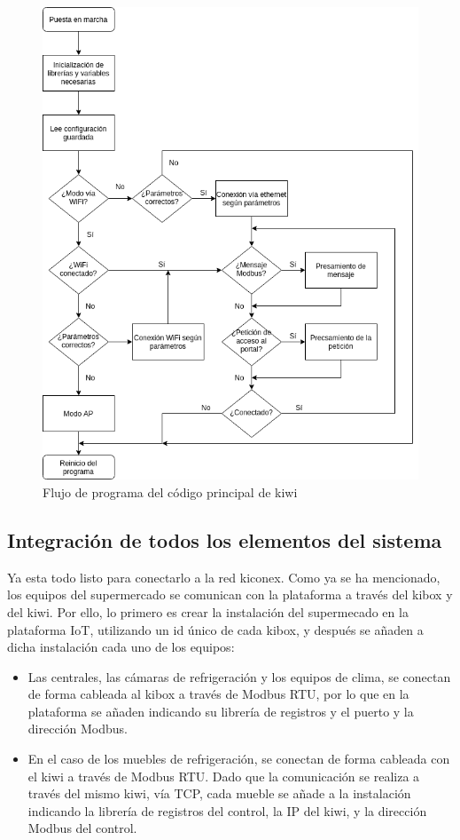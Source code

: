 \begin{figure}[H]
  \centering
  \includegraphics[width=15cm, keepaspectratio]{img/flujoProgramaPrincipal}
  \caption{Flujo de programa del código principal de kiwi}
  \label{figura:flujoProgramaPrincipal}
\end{figure}


\subsection{Integración de todos los elementos del sistema}
\label{subsec:integracionComponentes}

Ya esta todo listo para conectarlo a la red kiconex. Como ya se ha mencionado, los equipos del supermercado se comunican con la plataforma a través del kibox y del kiwi. Por ello, lo primero es crear la instalación del supermecado en la plataforma IoT, utilizando un id único de cada kibox, y después se añaden a dicha instalación cada uno de los equipos: 

\begin{itemize}
  \item Las centrales, las cámaras de refrigeración y los equipos de clima, se conectan de forma cableada al kibox a través de Modbus RTU, por lo que en la plataforma se añaden indicando su librería de registros y el puerto y la dirección Modbus.
  \item En el caso de los muebles de refrigeración, se conectan de forma cableada con el kiwi a través de Modbus RTU. Dado que la comunicación se realiza a través del mismo kiwi, vía TCP, cada mueble se añade a la instalación indicando la librería de registros del control, la IP del kiwi, y la dirección Modbus del control. 
\end{itemize}

